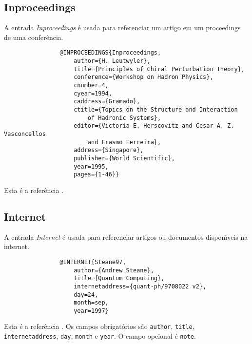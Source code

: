 \documentclass[a4paper,12pt]{article}
\newcommand{\ii}{\'{\i}}
\newcommand{\ca}{\c{c}\~ao}
\newcommand{\enf}{\em}
\begin{document}
			
			
			\subsection*{Inproceedings}
			
			A entrada {\enf Inproceedings} \'e usada para referenciar um artigo em um 
			proceedings de uma confer\^encia.
			\begin{verbatim}
				@INPROCEEDINGS{Inproceedings,
					author={H. Leutwyler},
					title={Principles of Chiral Perturbation Theory},
					conference={Workshop on Hadron Physics},
					cnumber=4,
					cyear=1994,
					caddress={Gramado},
					ctitle={Topics on the Structure and Interaction
						of Hadronic Systems},
					editor={Victoria E. Herscovitz and Cesar A. Z. Vasconcellos
						and Erasmo Ferreira},
					address={Singapore},
					publisher={World Scientific},
					year=1995,
					pages={1-46}}
			\end{verbatim}
			Esta \'e a refer\^encia \cite{Inproceedings}.
			
			
			\subsection*{Internet}
			
			A entrada {\enf Internet} \'e usada para referenciar artigos ou
			documentos dispon{\ii}\-veis na internet.
			\begin{verbatim}
				@INTERNET{Steane97,
					author={Andrew Steane},
					title={Quantum Computing},
					internetaddress={quant-ph/9708022 v2},
					day=24,
					month=sep,
					year=1997}
			\end{verbatim}
			Esta \'e a refer\^encia \cite{Steane97}.
			Os campos obrigat\'orios s\~ao \verb+author+,
			\verb+title+, \verb+interne+\-\verb+taddress+, 
			\verb+day+, \verb+month+ e \verb+year+.
			O campo opcional \'e \verb+note+.
			
			
			
			
			\begin{comment}
				\subsection*{Manual}
				
				A entrada {\enf Manual} \'e usada para referenciar documenta{\ca}
				t\'ecnica.
				Sua forma geral \'e \cite{}
				\begin{verbatim}
				\end{verbatim}
			\end{comment}
			
\end{document}
